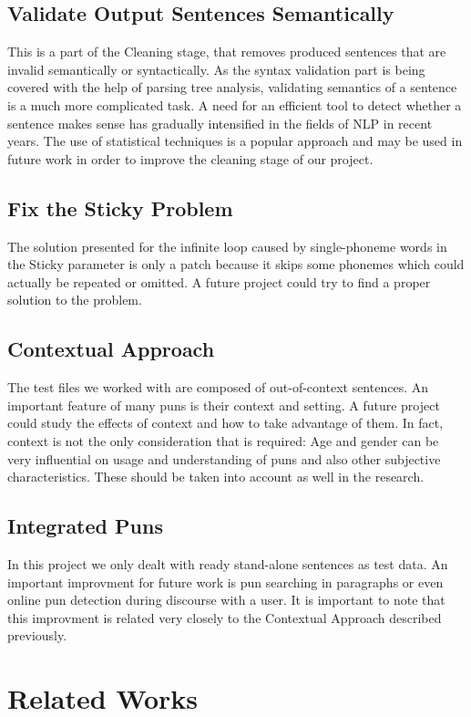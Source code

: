 \documentclass[11pt,a4paper]{article}
\begin{document}
\subsection{Validate Output Sentences Semantically}
This is a part of the Cleaning stage, that removes produced sentences that are invalid semantically or syntactically. As the syntax validation part is being covered with the help of parsing tree analysis, validating semantics of a sentence is a much more complicated task. A need for an efficient tool to detect whether a sentence makes sense has gradually intensified in the fields of NLP in recent years. The use of statistical techniques is a popular approach and may be used in future work in order to improve the cleaning stage of our project.

\subsection{Fix the Sticky Problem}
The solution presented for the infinite loop caused by single-phoneme words in the Sticky parameter is only a patch because it skips some phonemes which could actually be repeated or omitted. A future project could try to find a proper solution to the problem.

\subsection{Contextual Approach}
The test files we worked with are composed of out-of-context sentences. An important feature of many puns is their context and setting. A future project could study the effects of context and how to take advantage of them. In fact, context is not the only consideration that is required: Age and gender can be very influential on usage and understanding of puns and also other subjective characteristics. These should be taken into account as well in the research.

\subsection{Integrated Puns}
In this project we only dealt with ready stand-alone sentences as test data. An important improvment for future work is pun searching in paragraphs or even online pun detection during discourse with a user. It is important to note that this improvment is related very closely to the Contextual Approach described previously.

\section{Related Works}
\end{document}
